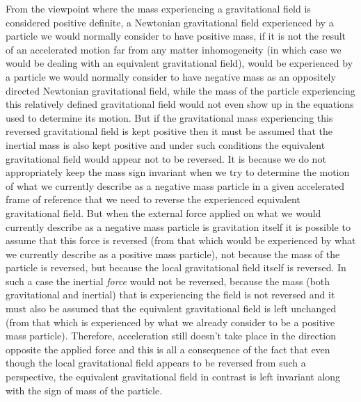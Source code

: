 \documentclass[notitlepage,12pt]{report}
\begin{document}
From the viewpoint where the mass experiencing a gravitational field is considered positive definite, a Newtonian gravitational field experienced by a particle we would normally consider to have positive mass, if it is not the result of an accelerated motion far from any matter inhomogeneity (in which case we would be dealing with an equivalent gravitational field), would be experienced by a particle we would normally consider to have negative mass as an oppositely directed Newtonian gravitational field, while the mass of the particle experiencing this relatively defined gravitational field would not even show up in the equations used to determine its motion. But if the gravitational mass experiencing this reversed gravitational field is kept positive then it must be assumed that the inertial mass is also kept positive and under such conditions the equivalent gravitational field would appear not to be reversed. It is because we do not appropriately keep the mass sign invariant when we try to determine the motion of what we currently describe as a negative mass particle in a given accelerated frame of reference that we need to reverse the experienced equivalent gravitational field. But when the external force applied on what we would currently describe as a negative mass particle is gravitation itself it is possible to assume that this force is reversed (from that which would be experienced by what we currently describe as a positive mass particle), not because the mass of the particle is reversed, but because the local gravitational field itself is reversed. In such a case the inertial \textit{force} would not be reversed, because the mass (both gravitational and inertial) that is experiencing the field is not reversed and it must also be assumed that the equivalent gravitational field is left unchanged (from that which is experienced by what we already consider to be a positive mass particle). Therefore, acceleration still doesn't take place in the direction opposite the applied force and this is all a consequence of the fact that even though the local gravitational field appears to be reversed from such a perspective, the equivalent gravitational field in contrast is left invariant along with the sign of mass of the particle.
\end{document}
